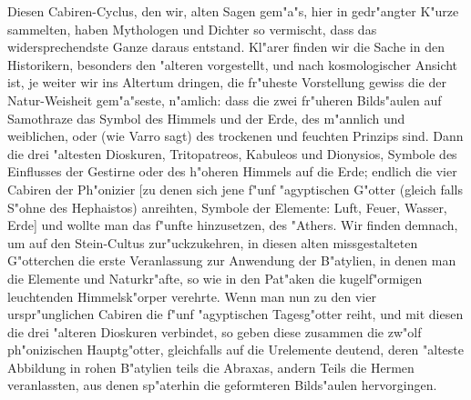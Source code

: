 \documentclass[a4paper, 11pt, oneside, polutonikogreek, german]{article}
\begin{document}
Diesen Cabiren-Cyclus, den wir, alten Sagen gem"a"s, hier in gedr"angter K"urze sammelten, haben Mythologen und Dichter so vermischt, dass das widersprechendste Ganze daraus entstand. Kl"arer finden wir die Sache in den Historikern, besonders den "alteren vorgestellt, und nach kosmologischer Ansicht ist, je weiter wir ins Altertum dringen, die fr"uheste Vorstellung gewiss die der Natur-Weisheit gem"a"seste, n"amlich: dass die zwei fr"uheren Bilds"aulen auf Samothraze das Symbol des Himmels und der Erde, des m"annlich und weiblichen, oder (wie Varro sagt) des trockenen und feuchten Prinzips sind. Dann die drei "altesten Dioskuren, Tritopatreos, Kabuleos und Dionysios, Symbole des Einflusses der Gestirne oder des h"oheren Himmels auf die Erde; endlich die vier Cabiren der Ph"onizier [zu denen sich jene f"unf "agyptischen G"otter (gleich falls S"ohne des Hephaistos) anreihten, Symbole der Elemente: Luft, Feuer, Wasser, Erde] und wollte man das f"unfte hinzusetzen, des "Athers. Wir finden demnach, um auf den Stein-Cultus zur"uckzukehren, in diesen alten missgestalteten G"otterchen die erste Veranlassung zur Anwendung der B"atylien, in denen man die Elemente und Naturkr"afte, so wie in den Pat"aken die kugelf"ormigen leuchtenden Himmelsk"orper verehrte. Wenn man nun zu den vier urspr"unglichen Cabiren die f"unf "agyptischen Tagesg"otter reiht, und mit diesen die drei "alteren Dioskuren verbindet, so geben diese zusammen die zw"olf ph"onizischen Hauptg"otter, gleichfalls auf die Urelemente deutend, deren "alteste Abbildung in rohen B"atylien teils die Abraxas, andern Teils die Hermen veranlassten, aus denen sp"aterhin die geformteren Bilds"aulen hervorgingen.
\end{document}
